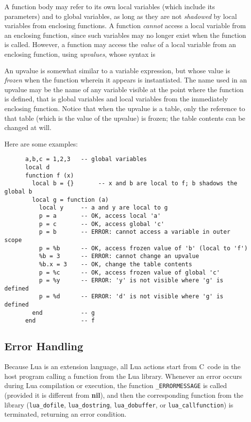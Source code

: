 \documentclass[11pt]{article}
\newcommand{\nil}{{\bf nil}}
\newcommand{\Deffunc}[1]{\index{#1}}
\renewcommand{\ter}[1]{{\rm`{\tt#1}'}}
\begin{document}
A function body may refer to its own local variables
(which include its parameters) and to global variables,
as long as they are not \emph{shadowed} by local
variables from enclosing functions.
A function \emph{cannot} access a local
variable from an enclosing function,
since such variables may no longer exist when the function is called.
However, a function may access the \emph{value} of a local variable
from an enclosing function, using \emph{upvalues},
whose syntax is
\begin{Produc}
\produc{upvalue}{\ter{\%} name}
\end{Produc}%
An upvalue is somewhat similar to a variable expression,
but whose value is \emph{frozen} when the function wherein it
appears is instantiated.
The name used in an upvalue may be the name of any variable visible
at the point where the function is defined,
that is
global variables and local variables from the immediately enclosing function.
Notice that when the upvalue is a table,
only the reference to that table
(which is the value of the upvalue) is frozen;
the table contents can be changed at will.

Here are some examples:
\begin{verbatim}
      a,b,c = 1,2,3   -- global variables
      local d
      function f (x)
        local b = {}       -- x and b are local to f; b shadows the global b
        local g = function (a)
          local y     -- a and y are local to g
          p = a       -- OK, access local 'a'
          p = c       -- OK, access global 'c'
          p = b       -- ERROR: cannot access a variable in outer scope
          p = %b      -- OK, access frozen value of 'b' (local to 'f')
          %b = 3      -- ERROR: cannot change an upvalue
          %b.x = 3    -- OK, change the table contents
          p = %c      -- OK, access frozen value of global 'c'
          p = %y      -- ERROR: 'y' is not visible where 'g' is defined
          p = %d      -- ERROR: 'd' is not visible where 'g' is defined
        end           -- g
      end             -- f
\end{verbatim}


\subsection{Error Handling} \label{error}

Because Lua is an extension language,
all Lua actions start from C~code in the host program
calling a function from the Lua library.
Whenever an error occurs during Lua compilation or execution,
the function \verb|_ERRORMESSAGE| is called \Deffunc{_ERRORMESSAGE}
(provided it is different from \nil),
and then the corresponding function from the library
(\verb|lua_dofile|, \verb|lua_dostring|,
\verb|lua_dobuffer|, or \verb|lua_callfunction|)
is terminated, returning an error condition.
\end{document}
